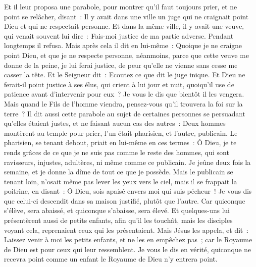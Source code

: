 \begin{multicols}{2}
\VerseOne{}Et il leur proposa une parabole, pour montrer qu'il faut toujours prier, et ne point se relâcher,
disant~: Il y avait dans une ville un juge qui ne craignait point Dieu et qui ne respectait personne.
Et dans la même ville, il y avait une veuve, qui venait souvent lui dire~: Fais-moi justice de ma partie adverse.
Pendant longtemps il refusa. Mais après cela il dit en lui-même~: Quoique je ne craigne point Dieu, et que je ne respecte personne,
néanmoins, parce que cette veuve me donne de la peine, je lui ferai justice, de peur qu'elle ne vienne sans cesse me casser la tête.
Et le Seigneur dit~: Ecoutez ce que dit le juge inique.
Et Dieu ne ferait-il point justice à ses élus, qui crient à lui jour et nuit, quoiqu'il use de patience avant d'intervenir pour eux~?
Je vous le dis que bientôt il les vengera. Mais quand le Fils de l'homme viendra, pensez-vous qu'il trouvera la foi sur la terre~?
Il dit aussi cette parabole au sujet de certaines personnes se persuadant qu'elles étaient justes, et ne faisant aucun cas des autres~:
Deux hommes montèrent au temple pour prier, l'un était pharisien, et l'autre, publicain.
Le pharisien, se tenant debout, priait en lui-même en ces termes~: Ô Dieu, je te rends grâces de ce que je ne suis pas comme le reste des hommes, qui sont ravisseurs, injustes, adultères, ni même comme ce publicain.
Je jeûne deux fois la semaine, et je donne la dîme de tout ce que je possède.
Mais le publicain se tenant loin, n'osait même pas lever les yeux vers le ciel, mais il se frappait la poitrine, en disant~: Ô Dieu, sois apaisé envers moi qui suis pécheur~!
Je vous dis que celui-ci descendit dans sa maison justifié, plutôt que l'autre. Car quiconque s'élève, sera abaissé, et quiconque s'abaisse, sera élevé.
Et quelques-uns lui présentèrent aussi de petits enfants, afin qu'il les touchât, mais les disciples voyant cela, reprenaient ceux qui les présentaient.
Mais Jésus les appela, et dit~: Laissez venir à moi les petits enfants, et ne les en empêchez pas~; car le Royaume de Dieu est pour ceux qui leur ressemblent.
Je vous le dis en vérité, quiconque ne recevra point comme un enfant le Royaume de Dieu n'y entrera point.

\end{multicols}
